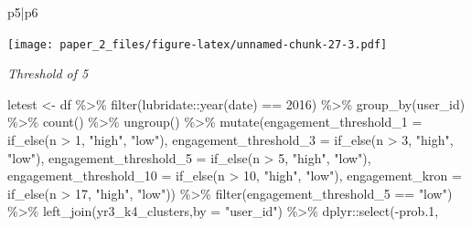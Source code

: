 \documentclass[
]{article}
\newenvironment{Shaded}{\begin{snugshade}}{\end{snugshade}}
\newcommand{\AttributeTok}[1]{\textcolor[rgb]{0.77,0.63,0.00}{#1}}
\newcommand{\DecValTok}[1]{\textcolor[rgb]{0.00,0.00,0.81}{#1}}
\newcommand{\FloatTok}[1]{\textcolor[rgb]{0.00,0.00,0.81}{#1}}
\newcommand{\FunctionTok}[1]{\textcolor[rgb]{0.00,0.00,0.00}{#1}}
\newcommand{\NormalTok}[1]{#1}
\newcommand{\OtherTok}[1]{\textcolor[rgb]{0.56,0.35,0.01}{#1}}
\newcommand{\SpecialCharTok}[1]{\textcolor[rgb]{0.00,0.00,0.00}{#1}}
\newcommand{\StringTok}[1]{\textcolor[rgb]{0.31,0.60,0.02}{#1}}
\begin{document}
\begin{Shaded}
\begin{Highlighting}[]
\NormalTok{p5}\SpecialCharTok{|}\NormalTok{p6}
\end{Highlighting}
\end{Shaded}

\texttt{[image: paper\_2\_files/figure-latex/unnamed-chunk-27-3.pdf]}

\emph{Threshold of 5}

\begin{Shaded}
\begin{Highlighting}[]
\NormalTok{letest }\OtherTok{\textless{}{-}}\NormalTok{  df }\SpecialCharTok{\%\textgreater{}\%}
  \FunctionTok{filter}\NormalTok{(lubridate}\SpecialCharTok{::}\FunctionTok{year}\NormalTok{(date) }\SpecialCharTok{==} \DecValTok{2016}\NormalTok{) }\SpecialCharTok{\%\textgreater{}\%}
  \FunctionTok{group\_by}\NormalTok{(user\_id) }\SpecialCharTok{\%\textgreater{}\%}
  \FunctionTok{count}\NormalTok{() }\SpecialCharTok{\%\textgreater{}\%}
  \FunctionTok{ungroup}\NormalTok{() }\SpecialCharTok{\%\textgreater{}\%} 
  \FunctionTok{mutate}\NormalTok{(}\AttributeTok{engagement\_threshold\_1 =} \FunctionTok{if\_else}\NormalTok{(n }\SpecialCharTok{\textgreater{}} \DecValTok{1}\NormalTok{, }\StringTok{"high"}\NormalTok{, }\StringTok{"low"}\NormalTok{),}
         \AttributeTok{engagement\_threshold\_3 =} \FunctionTok{if\_else}\NormalTok{(n }\SpecialCharTok{\textgreater{}} \DecValTok{3}\NormalTok{, }\StringTok{"high"}\NormalTok{, }\StringTok{"low"}\NormalTok{),}
         \AttributeTok{engagement\_threshold\_5 =} \FunctionTok{if\_else}\NormalTok{(n }\SpecialCharTok{\textgreater{}} \DecValTok{5}\NormalTok{, }\StringTok{"high"}\NormalTok{, }\StringTok{"low"}\NormalTok{),}
         \AttributeTok{engagement\_threshold\_10 =} \FunctionTok{if\_else}\NormalTok{(n }\SpecialCharTok{\textgreater{}} \DecValTok{10}\NormalTok{, }\StringTok{"high"}\NormalTok{, }\StringTok{"low"}\NormalTok{),}
         \AttributeTok{engagement\_kron =} \FunctionTok{if\_else}\NormalTok{(n }\SpecialCharTok{\textgreater{}} \DecValTok{17}\NormalTok{, }\StringTok{"high"}\NormalTok{, }\StringTok{"low"}\NormalTok{)) }\SpecialCharTok{\%\textgreater{}\%} 
  \FunctionTok{filter}\NormalTok{(engagement\_threshold\_5 }\SpecialCharTok{==} \StringTok{"low"}\NormalTok{) }\SpecialCharTok{\%\textgreater{}\%} 
  \FunctionTok{left\_join}\NormalTok{(yr3\_k4\_clusters,}\AttributeTok{by =} \StringTok{"user\_id"}\NormalTok{) }\SpecialCharTok{\%\textgreater{}\%} 
\NormalTok{  dplyr}\SpecialCharTok{::}\FunctionTok{select}\NormalTok{(}\SpecialCharTok{{-}}\NormalTok{prob}\FloatTok{.1}\NormalTok{,}

\end{Highlighting}
\end{Shaded}
\end{document}
